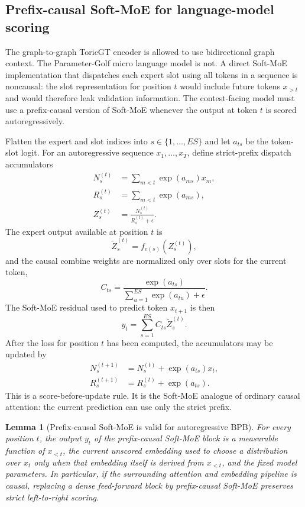 \documentclass[11pt]{article}
\theoremstyle{definition}
\theoremstyle{plain}
\newtheorem{lemma}[definition]{Lemma}
\theoremstyle{remark}
\numberwithin{equation}{section}
\begin{document}
\subsection{Prefix-causal Soft-MoE for language-model scoring}

The graph-to-graph ToricGT encoder is allowed to use bidirectional graph context.  The Parameter-Golf micro language model is not.  A direct Soft-MoE implementation that dispatches each expert slot using all tokens in a sequence is noncausal: the slot representation for position $t$ would include future tokens $x_{>t}$ and would therefore leak validation information.  The contest-facing model must use a prefix-causal version of Soft-MoE whenever the output at token $t$ is scored autoregressively.

Flatten the expert and slot indices into $s\in\{1,\dots,E S\}$ and let $a_{t s}$ be the token-slot logit.  For an autoregressive sequence $x_1,\dots,x_T$, define strict-prefix dispatch accumulators
\begin{align}
  N_s^{(t)} &= \sum_{m<t}\exp(a_{m s})x_m,\\
  R_s^{(t)} &= \sum_{m<t}\exp(a_{m s}),\\
  Z_s^{(t)} &= \frac{N_s^{(t)}}{R_s^{(t)}+\epsilon}.
\end{align}
The expert output available at position $t$ is
\begin{equation}
  \widetilde Z_s^{(t)}=f_{e(s)}\!\left(Z_s^{(t)}\right),
\end{equation}
and the causal combine weights are normalized only over slots for the current token,
\begin{equation}
  C_{t s}=\frac{\exp(a_{t s})}{\sum_{u=1}^{E S}\exp(a_{t u})+\epsilon}.
\end{equation}
The Soft-MoE residual used to predict token $x_{t+1}$ is then
\begin{equation}
  y_t=\sum_{s=1}^{E S}C_{t s}\widetilde Z_s^{(t)}.
\end{equation}
After the loss for position $t$ has been computed, the accumulators may be updated by
\begin{align}
  N_s^{(t+1)} &= N_s^{(t)}+\exp(a_{t s})x_t,\\
  R_s^{(t+1)} &= R_s^{(t)}+\exp(a_{t s}).
\end{align}
This is a score-before-update rule.  It is the Soft-MoE analogue of ordinary causal attention: the current prediction can use only the strict prefix.

\begin{lemma}[Prefix-causal Soft-MoE is valid for autoregressive BPB]
For every position $t$, the output $y_t$ of the prefix-causal Soft-MoE block is a measurable function of $x_{<t}$, the current unscored embedding used to choose a distribution over $x_t$ only when that embedding itself is derived from $x_{<t}$, and the fixed model parameters.  In particular, if the surrounding attention and embedding pipeline is causal, replacing a dense feed-forward block by prefix-causal Soft-MoE preserves strict left-to-right scoring.
\end{lemma}
\end{document}
